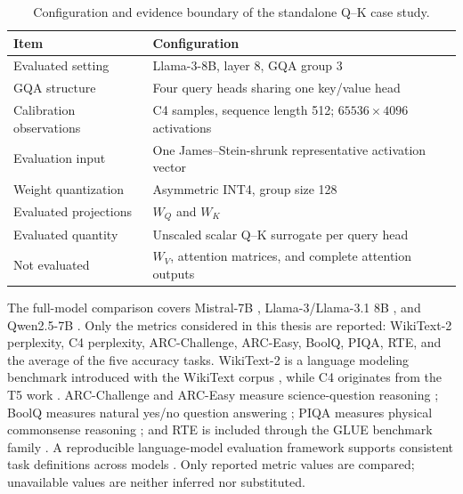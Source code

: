 \documentclass[../main.tex]{subfiles}
\begin{document}
\begin{table}[H]
\centering
\caption[Standalone case-study configuration]{Configuration and evidence boundary of the standalone Q--K case study.}
\label{tab:qkv-standalone-configuration}
\setlength{\tabcolsep}{6pt}
\renewcommand{\arraystretch}{1.15}
\begin{tabular}{>{\raggedright\arraybackslash}p{}>{\raggedright\arraybackslash}p{}}
\hline
Item & Configuration \\
\hline
Evaluated setting & Llama-3-8B, layer 8, GQA group 3 \\
GQA structure & Four query heads sharing one key/value head \\
Calibration observations & 128 C4 samples, sequence length 512; $65536 \times 4096$ activations \\
Evaluation input & One James--Stein-shrunk representative activation vector \\
Weight quantization & Asymmetric INT4, group size 128 \\
Evaluated projections & $W_Q$ and $W_K$ \\
Evaluated quantity & Unscaled scalar Q--K surrogate per query head \\
Not evaluated & $W_V$, attention matrices, and complete attention outputs \\
\hline
\end{tabular}
\end{table}

The full-model comparison covers Mistral-7B \cite{jiang2023mistral}, Llama-3/Llama-3.1 8B \cite{dubey2024llama3}, and Qwen2.5-7B \cite{qwen2024qwen25}. Only the metrics considered in this thesis are reported: WikiText-2 perplexity, C4 perplexity, ARC-Challenge, ARC-Easy, BoolQ, PIQA, RTE, and the average of the five accuracy tasks. WikiText-2 is a language modeling benchmark introduced with the WikiText corpus \cite{merity2016pointer}, while C4 originates from the T5 work \cite{raffel2020t5}. ARC-Challenge and ARC-Easy measure science-question reasoning \cite{clark2018arc}; BoolQ measures natural yes/no question answering \cite{clark2019boolq}; PIQA measures physical commonsense reasoning \cite{bisk2020piqa}; and RTE is included through the GLUE benchmark family \cite{wang2018glue}. A reproducible language-model evaluation framework supports consistent task definitions across models \cite{biderman2024reproducible}. Only reported metric values are compared; unavailable values are neither inferred nor substituted.
\end{document}
